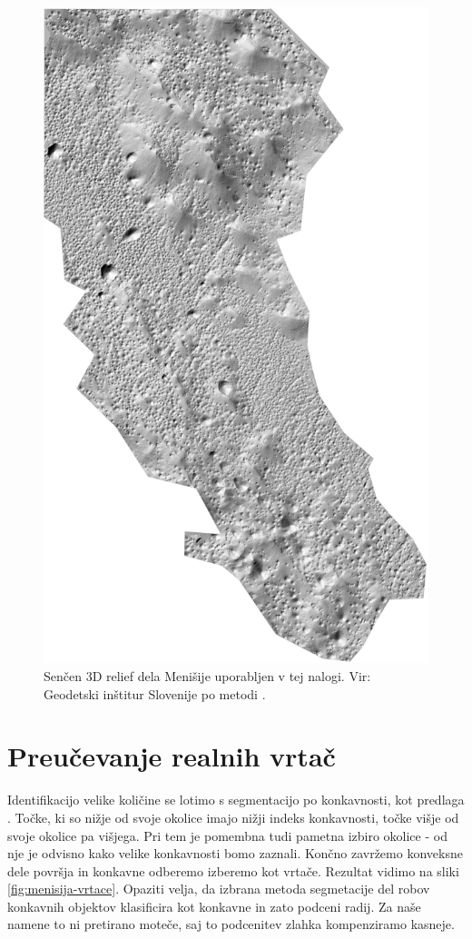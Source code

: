 \documentclass[a4paper, oneside, 12pt]{book}
\begin{document}
\begin{figure}[H]
  \begin{center}
    \includegraphics[width=12cm]{slike/menisija-relief}
  \end{center}
  \caption{Senčen 3D relief dela Menišije uporabljen v tej nalogi. Vir: Geodetski inštitur Slovenije \cite{LAK} po metodi \cite{Kobler20079}.}
  \label{fig:menisija-relief}
\end{figure}
\chapter{Preučevanje realnih vrtač}
\label{realne-vrtace}
Identifikacijo velike količine se lotimo s segmentacijo po konkavnosti, kot predlaga \cite{doctor13}. Točke, ki so nižje od svoje okolice imajo nižji indeks konkavnosti, točke višje od svoje okolice pa višjega. Pri tem je pomembna tudi pametna izbiro okolice - od nje je odvisno kako velike konkavnosti bomo zaznali. Končno zavržemo konveksne dele površja in konkavne odberemo izberemo kot vrtače. Rezultat vidimo na sliki \ref{fig:menisija-vrtace}. Opaziti velja, da izbrana metoda segmetacije del robov konkavnih objektov klasificira kot konkavne in zato podceni radij. Za naše namene to ni pretirano moteče, saj to podcenitev zlahka kompenziramo kasneje.
\end{document}
